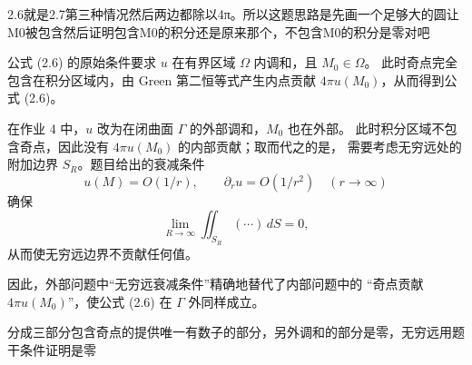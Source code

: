 \begin{dxtips}
    2.6就是2.7第三种情况然后两边都除以4π。所以这题思路是先画一个足够大的圆让M0被包含然后证明包含M0的积分还是原来那个，不包含M0的积分是零对吧
\end{dxtips}
\begin{note}
公式 (2.6) 的原始条件要求 $u$ 在有界区域 $\Omega$ 内调和，且 $M_0\in\Omega$。
此时奇点完全包含在积分区域内，由 Green 第二恒等式产生内点贡献
$4\pi u(M_0)$，从而得到公式 (2.6)。

在作业 4 中，$u$ 改为在闭曲面 $\Gamma$ 的外部调和，$M_0$ 也在外部。
此时积分区域不包含奇点，因此没有 $4\pi u(M_0)$ 的内部贡献；取而代之的是，
需要考虑无穷远处的附加边界 $S_R$。题目给出的衰减条件
\[
u(M)=O(1/r),\qquad 
\partial_r u = O(1/r^2)
\quad (r\to\infty)
\]
确保
\[
\lim_{R\to\infty}\iint_{S_R}(\cdots)\,dS = 0,
\]
从而使无穷远边界不贡献任何值。

因此，外部问题中“无穷远衰减条件”精确地替代了内部问题中的
“奇点贡献 $4\pi u(M_0)$”，使公式 (2.6) 在 $\Gamma$ 外同样成立。
\end{note}
\begin{dxtips}
    分成三部分包含奇点的提供唯一有数子的部分，另外调和的部分是零，无穷远用题干条件证明是零
\end{dxtips}
